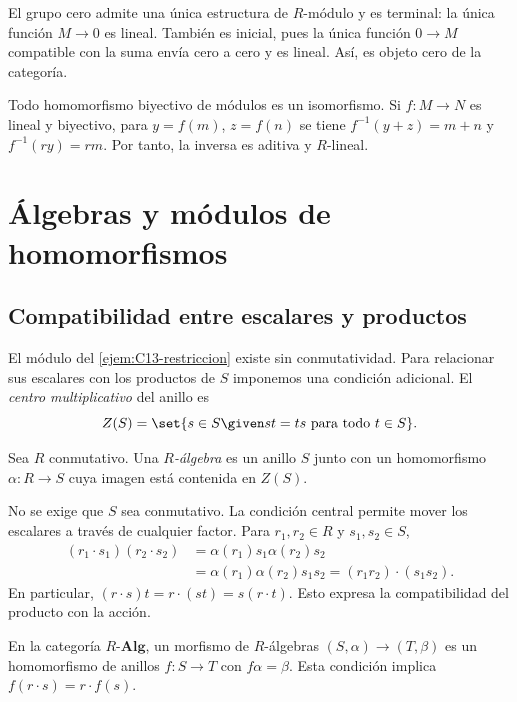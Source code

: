 El grupo cero admite una única estructura de $R$-módulo y es terminal: la única función $M\to0$ es lineal. También es inicial, pues la única función $0\to M$ compatible con la suma envía cero a cero y es lineal. Así, es objeto cero de la categoría.

Todo homomorfismo biyectivo de módulos es un isomorfismo. Si $f:M\to N$ es lineal y biyectivo, para $y=f(m)$, $z=f(n)$ se tiene $f^{-1}(y+z)=m+n$ y $f^{-1}(ry)=rm$. Por tanto, la inversa es aditiva y $R$-lineal.

\section{Álgebras y módulos de homomorfismos}
\subsection{Compatibilidad entre escalares y productos}
El módulo del \cref{ejem:C13-restriccion} existe sin conmutatividad. Para relacionar sus escalares con los productos de $S$ imponemos una condición adicional. El \emph{centro multiplicativo} del anillo es
\[
Z(S)=\set{s\in S\given st=ts\text{ para todo }t\in S}.
\]
\begin{defi}
Sea $R$ conmutativo. Una \emph{$R$-álgebra} es un anillo $S$ junto con un homomorfismo $\alpha:R\to S$ cuya imagen está contenida en $Z(S)$.
\end{defi}
No se exige que $S$ sea conmutativo. La condición central permite mover los escalares a través de cualquier factor. Para $r_1,r_2\in R$ y $s_1,s_2\in S$,
\[
\begin{aligned}
(r_1\cdot s_1)(r_2\cdot s_2)
&=\alpha(r_1)s_1\alpha(r_2)s_2\\
&=\alpha(r_1)\alpha(r_2)s_1s_2
=(r_1r_2)\cdot(s_1s_2).
\end{aligned}
\]
En particular, $(r\cdot s)t=r\cdot(st)=s(r\cdot t)$. Esto expresa la compatibilidad del producto con la acción.

En la categoría $R\text{-}\mathbf{Alg}$, un morfismo de $R$-álgebras $(S,\alpha)\to(T,\beta)$ es un homomorfismo de anillos $f:S\to T$ con $f\alpha=\beta$. Esta condición implica $f(r\cdot s)=r\cdot f(s)$.


